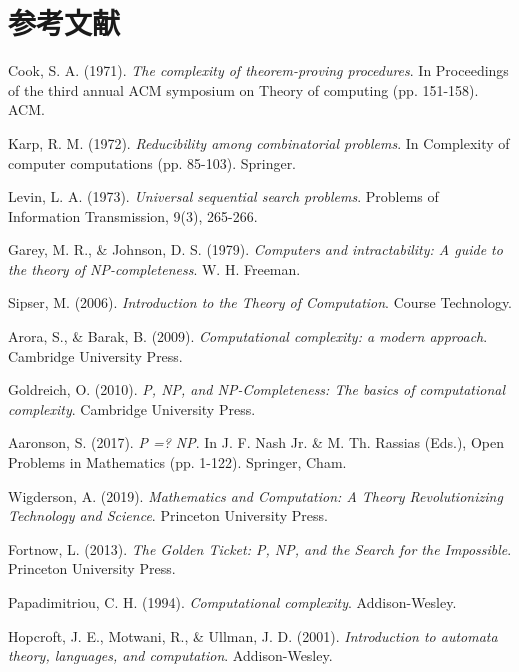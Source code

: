 \documentclass[a4paper,12pt]{ctexart}
\begin{document}
\section{参考文献}
\begin{thebibliography}{99}

Cook, S. A. (1971).
\textit{The complexity of theorem-proving procedures}.
In Proceedings of the third annual ACM symposium on Theory of computing (pp. 151-158).
ACM.

Karp, R. M. (1972).
\textit{Reducibility among combinatorial problems}.
In Complexity of computer computations (pp. 85-103).
Springer.

Levin, L. A. (1973).
\textit{Universal sequential search problems}.
Problems of Information Transmission, 9(3), 265-266.

Garey, M. R., \& Johnson, D. S. (1979).
\textit{Computers and intractability: A guide to the theory of NP-completeness}.
W. H. Freeman.

Sipser, M. (2006).
\textit{Introduction to the Theory of Computation}.
Course Technology.

Arora, S., \& Barak, B. (2009).
\textit{Computational complexity: a modern approach}.
Cambridge University Press.

Goldreich, O. (2010).
\textit{P, NP, and NP-Completeness: The basics of computational complexity}.
Cambridge University Press.

Aaronson, S. (2017).
\textit{P =? NP}.
In J. F. Nash Jr. \& M. Th. Rassias (Eds.), Open Problems in Mathematics (pp. 1-122).
Springer, Cham.

Wigderson, A. (2019).
\textit{Mathematics and Computation: A Theory Revolutionizing Technology and Science}.
Princeton University Press.

Fortnow, L. (2013).
\textit{The Golden Ticket: P, NP, and the Search for the Impossible}.
Princeton University Press.

Papadimitriou, C. H. (1994).
\textit{Computational complexity}.
Addison-Wesley.

Hopcroft, J. E., Motwani, R., \& Ullman, J. D. (2001).
\textit{Introduction to automata theory, languages, and computation}.
Addison-Wesley.


\end{thebibliography}
\end{document}
